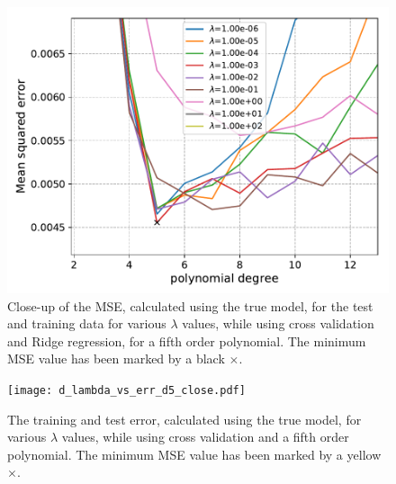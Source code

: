 \documentclass[a4paper,10pt,english]{article}
\begin{document}
\begin{figure}[H]
	\centering
	\includegraphics[scale=0.6]{d_Ridge_MSE_pdegree_lmbda_close.pdf}
	\caption{Close-up of the MSE, calculated using the true model, for the test and training data for various $\lambda$ values, while using cross validation and Ridge regression, for a fifth order polynomial. The minimum MSE value has been marked by a black $\times$.}
	\label{fig:6}
\end{figure}


 \begin{figure}[H]
	\centering
	\texttt{[image: d\_lambda\_vs\_err\_d5\_close.pdf]}
	\caption{The training and test error, calculated using the true model, for various $\lambda$ values, while using cross validation and a fifth order polynomial. The minimum MSE value has been marked by a yellow $\times$.}
	\label{fig:3}
\end{figure}


\end{document}
